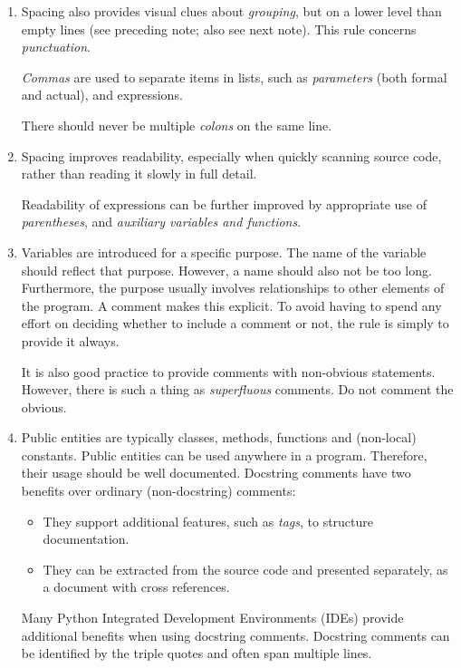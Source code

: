 \documentclass[nobib]{tufte-handout}
\newcommand{\B}{\bfseries}
\begin{document}
\begin{enumerate}
\item Spacing also provides visual clues about \emph{grouping},
\marginpar{\B Spacing~1}
  but on a lower level than empty lines
  (see preceding note; also see next note).
  This rule concerns \emph{punctuation}.
  
  \emph{Commas\/} are used to separate items in lists,
  such as \emph{parameters\/} (both formal and actual),
  and expressions.
  
  There should never be multiple \emph{colons\/} on the same line.
  
\item Spacing improves readability,
\marginpar{\B Spacing~2}
  especially when quickly scanning source code,
  rather than reading it slowly in full detail.
  
  Readability of expressions can be further improved by appropriate
  use of \emph{parentheses}, and \emph{auxiliary variables and functions}.

\item Variables are introduced for a specific purpose.
\marginpar{\B Comments}
  The name of the variable should reflect that purpose.
  However, a name should also not be too long.
  Furthermore, the purpose usually involves relationships to other
  elements of the program.
  A comment makes this explicit.
  To avoid having to spend any effort on deciding whether to include a comment or not,
  the rule is simply to provide it always.
  
  It is also good practice to provide comments with non-obvious statements.
  However, there is such a thing as \emph{superfluous\/} comments.
  Do not comment the obvious.

\item Public entities are typically classes, methods, functions 
\marginpar{\B Docstring}
  and (non-local) constants.
  Public entities can be used anywhere in a program.
  Therefore,
  their usage should be well documented.
  Docstring comments have two benefits over ordinary (non-docstring) comments:
  \begin{itemize}
  \item They support additional features, such as \emph{tags},
    to structure documentation.
  \item They can be extracted from the source code and presented separately,
    as a document with cross references.
  \end{itemize}
  Many Python Integrated Development Environments (IDEs)
  provide additional benefits when using docstring comments. 
  Docstring comments can be identified by the triple quotes and often span multiple lines. 


\end{enumerate}
\end{document}
